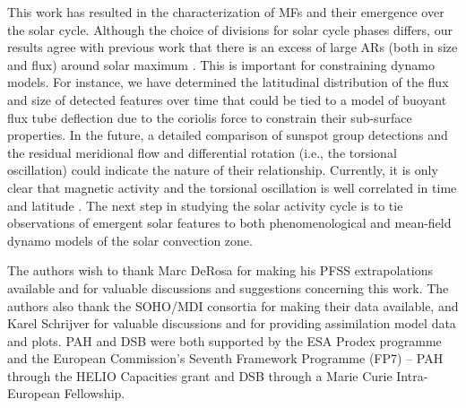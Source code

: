 \documentclass[namedreferences]{solarphysics}
\begin{document}
\begin{article}
This work has resulted in the characterization of MFs and their emergence over the solar cycle. Although the choice of divisions for solar cycle phases differs, our results agree with previous work that there is an excess of large ARs (both in size and flux) around solar maximum \citep[e.g.,][]{tang:1984,harvey:1993,meunier:2003}. This is important for constraining dynamo models. For instance, we have determined the latitudinal distribution of the flux and size of detected features over time that could be tied to a model of buoyant flux tube deflection due to the coriolis force to constrain their sub-surface properties. In the future, a detailed comparison of sunspot group detections and the residual meridional flow and differential rotation (i.e., the torsional oscillation) could indicate the nature of their relationship. Currently, it is only clear that magnetic activity and the torsional oscillation is  well correlated in time and latitude \citep{Hathaway:2011}. The next step in studying the solar activity cycle is to tie observations of emergent solar features to both phenomenological and mean-field dynamo models of the solar convection zone.  
















\begin{acks}
The authors wish to thank Marc DeRosa for making his PFSS extrapolations available and for valuable discussions and suggestions concerning this work. The authors also thank the SOHO/MDI consortia for making their data available, and Karel Schrijver for valuable discussions and for providing assimilation model data and plots. PAH and DSB were both supported by the ESA Prodex programme and the European Commission's Seventh Framework Programme (FP7) -- PAH through the HELIO Capacities grant and DSB through a Marie Curie Intra-European Fellowship.
\end{acks}


   

%


\end{article}
\end{document}
